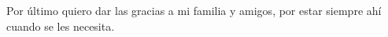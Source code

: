 Por último quiero dar las gracias a mi familia y amigos, por estar siempre ahí cuando se les necesita.
























































\color{black}

